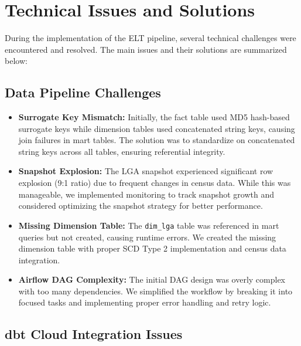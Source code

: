 \section{Technical Issues and Solutions}

During the implementation of the ELT pipeline, several technical challenges were encountered and resolved. The main issues and their solutions are summarized below:

\subsection{Data Pipeline Challenges}

\begin{itemize}
  \item \textbf{Surrogate Key Mismatch:} Initially, the fact table used MD5 hash-based surrogate keys while dimension tables used concatenated string keys, causing join failures in mart tables. The solution was to standardize on concatenated string keys across all tables, ensuring referential integrity.
  
  \item \textbf{Snapshot Explosion:} The LGA snapshot experienced significant row explosion (9:1 ratio) due to frequent changes in census data. While this was manageable, we implemented monitoring to track snapshot growth and considered optimizing the snapshot strategy for better performance.
  
  \item \textbf{Missing Dimension Table:} The \texttt{dim\_lga} table was referenced in mart queries but not created, causing runtime errors. We created the missing dimension table with proper SCD Type 2 implementation and census data integration.
  
  \item \textbf{Airflow DAG Complexity:} The initial DAG design was overly complex with too many dependencies. We simplified the workflow by breaking it into focused tasks and implementing proper error handling and retry logic.
\end{itemize}

\subsection{dbt Cloud Integration Issues}

